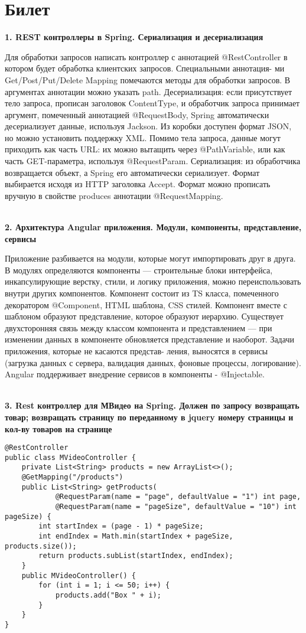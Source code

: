 \documentclass{article}
\newcommand{\bil}[5]{%
        \section{Билет}
        \textbf{1. #1}

        #4
        \\
        \textbf{2. #2}
        
        #5
        \\
        \textbf{3. #3}
}
\begin{document}
\bil{REST контроллеры в Spring. Сериализация и десериализация}
{Архитектура Angular приложения. Модули, компоненты, представление, сервисы}
{Rest контроллер для МВидео на Spring. Должен по запросу возвращать товар; возвращать страницу по переданному в jquery номеру страницы и кол-ву товаров на странице}{
    Для обработки запросов написать контроллер с аннотацией @RestController в котором будет обработка клиентских запросов. 
    Специальными аннотация- ми Get/Post/Put/Delete Mapping помечаются методы для обработки запросов. В аргументах аннотации можно указать path.
    Десериализация: если присутствует тело запроса, прописан заголовок ContentType, и обработчик запроса принимает аргумент, помеченный аннотацией @RequestBody, Spring автоматически десериализует данные, используя Jackson. Из коробки доступен формат JSON, но можно установить поддержку XML.
    Помимо тела запроса, данные могут приходить как часть URL: их можно вытащить через @PathVariable, или как часть GET-параметра, используя @RequestParam. 
    Сериализация: из обработчика возвращается объект, а Spring его автоматически сериализует. Формат выбирается исходя из HTTP заголовка Accept. Формат можно прописать вручную в свойстве produces аннотации @RequestMapping.
}{
    Приложение разбивается на модули, которые могут импортировать друг в друга. В модулях определяются компоненты — строительные блоки интерфейса, инкапсулирующие верстку, стили, и логику приложения, можно переиспользовать внутри других компонентов. 
    Компонент состоит из TS класса, помеченного декоратором @Component, HTML шаблона, CSS стилей. Компонент вместе с шаблоном образуют представление, которое образуют иерархию. Существует двухсторонняя связь между классом компонента и представлением — при изменении данных в компоненте обновляется представление и наоборот. 
    Задачи приложения, которые не касаются представ- ления, выносятся в сервисы (загрузка данных с сервера, валидация данных, фоновые процессы, логирование). 
    Angular поддерживает внедрение сервисов в компоненты - @Injectable.
}
\begin{lstlisting}[frame=single, basicstyle=\ttfamily, breaklines=true, breakatwhitespace=true, postbreak=\mbox{\textcolor{red}{$\hookrightarrow$}\space}]
@RestController
public class MVideoController {
    private List<String> products = new ArrayList<>();
    @GetMapping("/products")
    public List<String> getProducts(
            @RequestParam(name = "page", defaultValue = "1") int page,
            @RequestParam(name = "pageSize", defaultValue = "10") int pageSize) {
        int startIndex = (page - 1) * pageSize;
        int endIndex = Math.min(startIndex + pageSize, products.size());
        return products.subList(startIndex, endIndex);
    }
    public MVideoController() {
        for (int i = 1; i <= 50; i++) {
            products.add("Box " + i);
        }
    }
}    
\end{lstlisting}
\end{document}
